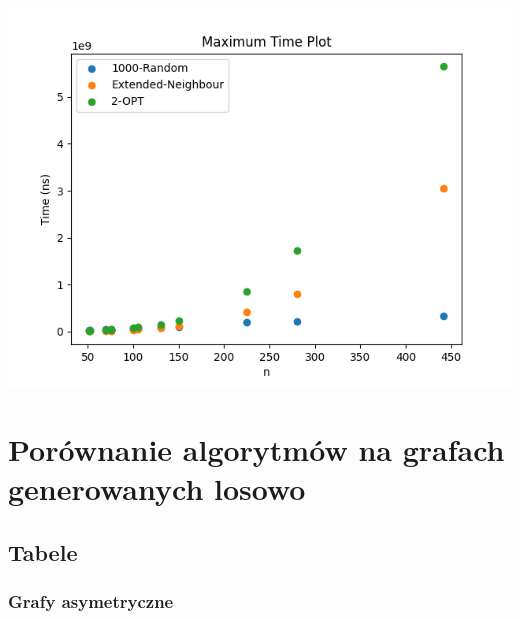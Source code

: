 \documentclass{article}
\begin{document}
\begin{center}
\includegraphics[width=\textwidth, 
                   height = 0.4\textheight, 
                   keepaspectratio]
                  {tsp_lib_max_time} 
\end{center}


\section{Porównanie algorytmów na grafach generowanych losowo}
\subsection{Tabele}

\subsubsection{Grafy asymetryczne}
\end{document}
